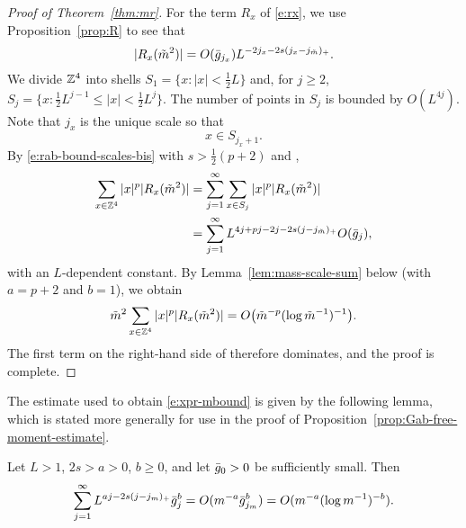 \begin{proof}[Proof of Theorem~\ref{thm:mr}]
For the term $R_x$ of \eqref{e:rx}, we use Proposition~\ref{prop:R}
to see that
\begin{equation}\label{e:rab-bound-scales-bis}
|R_x(\tilde m^2)|
	=
O(\bar{g}_{j_x})
L^{-2j_x - 2s (j_x - j_{\tilde m})_+}.
\end{equation}
We divide ${\mathbb Z}^4$ into shells $S_1 = \{x : |x| < \frac 12 L\}$ and, for $j \ge 2$,
$S_j = \{x : \frac 12 L^{j-1} \le |x| < \frac 12 L^{j}\}$.
The number of points in $S_j$ is bounded by $O(L^{4j})$.
Note that $j_x$ is the unique scale so that
\begin{equation}
   \label{e:Phi-def-jc}
    x \in S_{j_x +1}
   .
\end{equation}
By \eqref{e:rab-bound-scales-bis} with $s>\frac 12 (p+2)$ and ,
\begin{equation} \label{e:xpr-shells}
\begin{aligned}
\sum_{x\in{\mathbb Z}^4} |x|^p |R_{x}(\tilde m^2)|
	&= \sum_{j = 1}^\infty\sum_{x\in S_j}   |x|^p |R_{x}(\tilde m^2)| \\
    &= \sum_{j = 1}^\infty L^{4j + pj - 2j - 2s (j - j_{\tilde m})_+} O(\bar{g}_{j}),
\end{aligned}
\end{equation}
with an $L$-dependent constant.
By Lemma~\ref{lem:mass-scale-sum} below (with $a=p+2$ and $b=1$),
we obtain
\begin{equation}\label{e:xpr-mbound}
\tilde m^2 \sum_{x\in{\mathbb Z}^4} |x|^p |R_{x}(\tilde m^2)|
	=
O\big(\tilde m^{-p}(\log \tilde m^{-1})^{-1}\big).
\end{equation}
The first term on the right-hand side of  therefore dominates,
and the proof is complete.
\end{proof}

The estimate used to obtain \eqref{e:xpr-mbound} is given by the following lemma,
which is stated more generally for use in the proof of Proposition~\ref{prop:Gab-free-moment-estimate}.

\begin{lemma} \label{lem:mass-scale-sum}
Let $L>1$, $2s> a > 0$, $b \geq 0$, and let $\bar{g}_0>0$ be sufficiently small.
Then
\begin{equation} \label{e:gmsumbd}
\sum_{j=1}^\infty L^{aj - 2s (j - j_m)_+}
\bar{g}_j^b = O(m^{-a} \bar{g}_{j_m}^b) = O(m^{-a} (\log m^{-1})^{-b}).
\end{equation}
\end{lemma}

